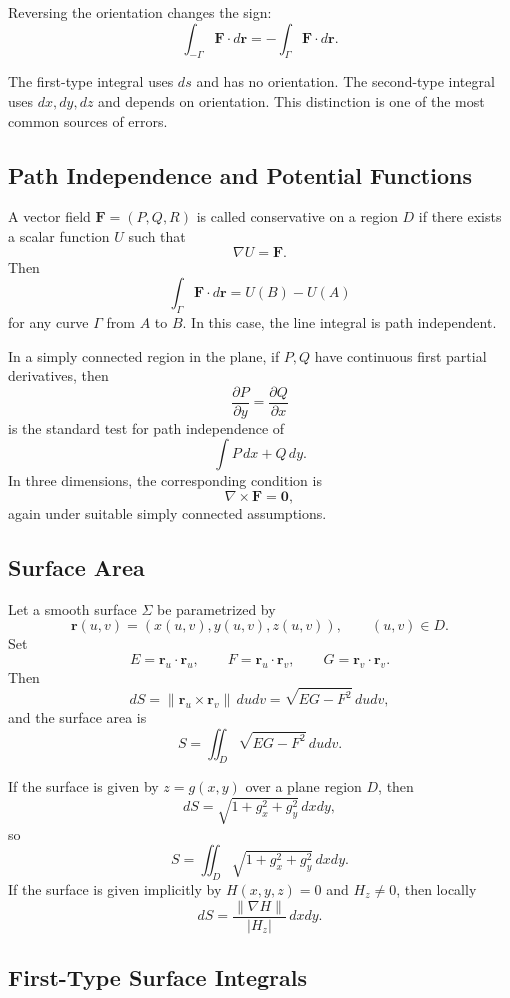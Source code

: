 Reversing the orientation changes the sign:
\[
    \int_{-\Gamma}\mathbf F\cdot d\mathbf r
    =-
    \int_{\Gamma}\mathbf F\cdot d\mathbf r.
\]

\begin{note}
The first-type integral uses $ds$ and has no orientation. The second-type integral uses $dx,dy,dz$ and depends on orientation. This distinction is one of the most common sources of errors.
\end{note}

\subsection{Path Independence and Potential Functions}

A vector field $\mathbf F=(P,Q,R)$ is called conservative on a region $D$ if there exists a scalar function $U$ such that
\[
    \nabla U=\mathbf F.
\]
Then
\[
    \int_{\Gamma}\mathbf F\cdot d\mathbf r
    =U(B)-U(A)
\]
for any curve $\Gamma$ from $A$ to $B$. In this case, the line integral is path independent.

In a simply connected region in the plane, if $P,Q$ have continuous first partial derivatives, then
\[
    \frac{\partial P}{\partial y}=\frac{\partial Q}{\partial x}
\]
is the standard test for path independence of
\[
    \int P\,dx+Q\,dy.
\]
In three dimensions, the corresponding condition is
\[
    \nabla\times\mathbf F=\mathbf 0,
\]
again under suitable simply connected assumptions.

\subsection{Surface Area}

Let a smooth surface $\Sigma$ be parametrized by
\[
    \mathbf r(u,v)=(x(u,v),y(u,v),z(u,v)),
    \qquad
    (u,v)\in D.
\]
Set
\[
    E=\mathbf r_u\cdot\mathbf r_u,
    \qquad
    F=\mathbf r_u\cdot\mathbf r_v,
    \qquad
    G=\mathbf r_v\cdot\mathbf r_v.
\]
Then
\[
    dS=\|\mathbf r_u\times\mathbf r_v\|\,dudv
    =\sqrt{EG-F^2}\,dudv,
\]
and the surface area is
\[
    S=\iint_D\sqrt{EG-F^2}\,dudv.
\]

If the surface is given by $z=g(x,y)$ over a plane region $D$, then
\[
    dS=\sqrt{1+g_x^2+g_y^2}\,dxdy,
\]
so
\[
    S=\iint_D\sqrt{1+g_x^2+g_y^2}\,dxdy.
\]
If the surface is given implicitly by $H(x,y,z)=0$ and $H_z\ne0$, then locally
\[
    dS=\frac{\|\nabla H\|}{|H_z|}\,dxdy.
\]

\subsection{First-Type Surface Integrals}

